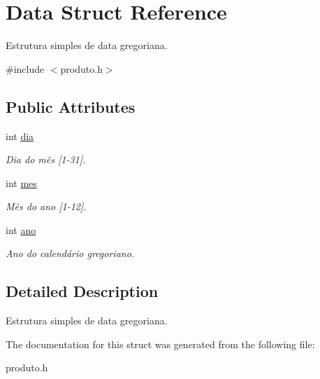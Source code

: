 \hypertarget{structData}{}\section{Data Struct Reference}
\label{structData}


Estrutura simples de data gregoriana.  




{\ttfamily \#include $<$produto.\+h$>$}

\subsection*{Public Attributes}
\begin{DoxyCompactItemize}
\item 
\mbox{\label{structData_ad76270db677fc394a4a7ded1c58de6d5}} 
int \hyperlink{structData_ad76270db677fc394a4a7ded1c58de6d5}{dia}
\begin{DoxyCompactList}\small\item\em Dia do mês \mbox{[}1-\/31\mbox{]}. \end{DoxyCompactList}\item 
\mbox{\label{structData_a8f77c5b515144e08b4fe26a8604f30ad}} 
int \hyperlink{structData_a8f77c5b515144e08b4fe26a8604f30ad}{mes}
\begin{DoxyCompactList}\small\item\em Mês do ano \mbox{[}1-\/12\mbox{]}. \end{DoxyCompactList}\item 
\mbox{\label{structData_a80d76fe2225d187fe8a20414478a2cb5}} 
int \hyperlink{structData_a80d76fe2225d187fe8a20414478a2cb5}{ano}
\begin{DoxyCompactList}\small\item\em Ano do calendário gregoriano. \end{DoxyCompactList}\end{DoxyCompactItemize}


\subsection{Detailed Description}
Estrutura simples de data gregoriana. 

The documentation for this struct was generated from the following file\+:\begin{DoxyCompactItemize}
\item 
produto.\+h\end{DoxyCompactItemize}
